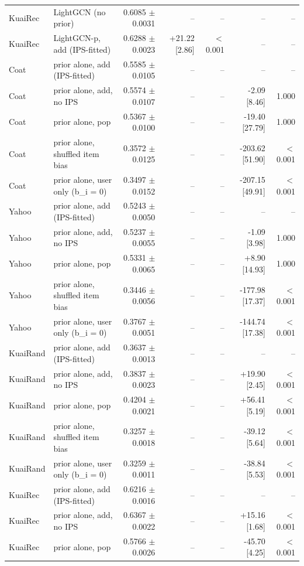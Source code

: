 \begin{table}[htbp]
{\begin{tabular}{llrrrrr}
KuaiRec & LightGCN (no prior) & 0.6085 $\pm$ 0.0031 & -- & -- & -- & -- \\
KuaiRec & LightGCN-p, add (IPS-fitted) & 0.6288 $\pm$ 0.0023 & +21.22 [2.86] & $<$0.001 & -- & -- \\
Coat & prior alone, add (IPS-fitted) & 0.5585 $\pm$ 0.0105 & -- & -- & -- & -- \\
Coat & prior alone, add, no IPS & 0.5574 $\pm$ 0.0107 & -- & -- & -2.09 [8.46] & 1.000 \\
Coat & prior alone, pop & 0.5367 $\pm$ 0.0100 & -- & -- & -19.40 [27.79] & 1.000 \\
Coat & prior alone, shuffled item bias & 0.3572 $\pm$ 0.0125 & -- & -- & -203.62 [51.90] & $<$0.001 \\
Coat & prior alone, user only (b\_i = 0) & 0.3497 $\pm$ 0.0152 & -- & -- & -207.15 [49.91] & $<$0.001 \\
Yahoo & prior alone, add (IPS-fitted) & 0.5243 $\pm$ 0.0050 & -- & -- & -- & -- \\
Yahoo & prior alone, add, no IPS & 0.5237 $\pm$ 0.0055 & -- & -- & -1.09 [3.98] & 1.000 \\
Yahoo & prior alone, pop & 0.5331 $\pm$ 0.0065 & -- & -- & +8.90 [14.93] & 1.000 \\
Yahoo & prior alone, shuffled item bias & 0.3446 $\pm$ 0.0056 & -- & -- & -177.98 [17.37] & $<$0.001 \\
Yahoo & prior alone, user only (b\_i = 0) & 0.3767 $\pm$ 0.0051 & -- & -- & -144.74 [17.38] & $<$0.001 \\
KuaiRand & prior alone, add (IPS-fitted) & 0.3637 $\pm$ 0.0013 & -- & -- & -- & -- \\
KuaiRand & prior alone, add, no IPS & 0.3837 $\pm$ 0.0023 & -- & -- & +19.90 [2.45] & $<$0.001 \\
KuaiRand & prior alone, pop & 0.4204 $\pm$ 0.0021 & -- & -- & +56.41 [5.19] & $<$0.001 \\
KuaiRand & prior alone, shuffled item bias & 0.3257 $\pm$ 0.0018 & -- & -- & -39.12 [5.64] & $<$0.001 \\
KuaiRand & prior alone, user only (b\_i = 0) & 0.3259 $\pm$ 0.0011 & -- & -- & -38.84 [5.53] & $<$0.001 \\
KuaiRec & prior alone, add (IPS-fitted) & 0.6216 $\pm$ 0.0016 & -- & -- & -- & -- \\
KuaiRec & prior alone, add, no IPS & 0.6367 $\pm$ 0.0022 & -- & -- & +15.16 [1.68] & $<$0.001 \\
KuaiRec & prior alone, pop & 0.5766 $\pm$ 0.0026 & -- & -- & -45.70 [4.25] & $<$0.001 \\

\end{tabular}}
\end{table}
